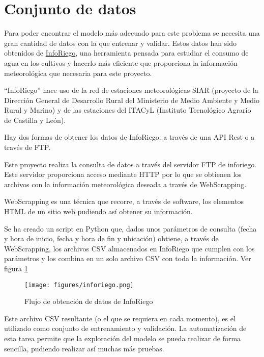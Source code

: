 \section{Conjunto de datos}
\label{makereference5.2}

Para poder encontrar el modelo más adecuado para este problema se necesita una gran cantidad de datos con la que entrenar y validar. Estos datos han sido obtenidos de \href{http://www.inforiego.org/opencms/opencms}{InfoRiego}, una herramienta pensada para estudiar el consumo de agua en los cultivos y hacerlo más eficiente que proporciona la información meteorológica que necesaria para este proyecto.

``InfoRiego'' hace uso de la red de estaciones meteorológicas SIAR (proyecto de la Dirección General de Desarrollo Rural del Ministerio de Medio Ambiente y Medio Rural y Marino) y de las estaciones del ITACyL (Instituto Tecnológico Agrario de Castilla y León).

Hay dos formas de obtener los datos de InfoRiego: a través de una API Rest o a través de FTP.

Este proyecto realiza la consulta de datos a través del servidor FTP de inforiego. Este servidor proporciona acceso mediante HTTP por lo que se obtienen los archivos con la información meteorológica deseada a través de WebScrapping.

WebScrapping es una técnica que recorre, a través de software, los elementos HTML de un sitio web pudiendo así obtener su información.

Se ha creado un script en Python que, dados unos parámetros de consulta (fecha y hora de inicio, fecha y hora de fin y ubicación) obtiene, a través de WebScrapping, los archivos CSV almacenados en InfoRiego que cumplen con los parámetros y los combina en un solo archivo CSV con toda la información. Ver figura \ref{inforiego}

\begin{figure}[htb]
	\begin{center}
		\texttt{[image: figures/inforiego.png]}
		\caption{Flujo de obtención de datos de InfoRiego \label{inforiego}}
	\end{center}
\end{figure}

Este archivo CSV resultante (o el que se requiera en cada momento), es el utilizado como conjunto de entrenamiento y validación. La automatización de esta tarea permite que la exploración del modelo se pueda realizar de forma sencilla, pudiendo realizar así muchas más pruebas.

